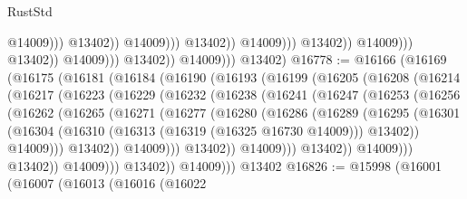 \begin{lexlean}{RustStd}
\begin{coremodule}
                                                              @14009)))
                                                        @13402))
                                                    @14009)))
                                              @13402))
                                          @14009)))
                                    @13402))
                                @14009)))
                          @13402))
                      @14009)))
                @13402))
            @14009)))
      @13402)
@16778 := @16166
    (@16169
      (@16175
        (@16181
          (@16184
            (@16190
              (@16193
                (@16199
                  (@16205
                    (@16208
                      (@16214
                        (@16217
                          (@16223
                            (@16229
                              (@16232
                                (@16238
                                  (@16241
                                    (@16247
                                      (@16253
                                        (@16256
                                          (@16262
                                            (@16265
                                              (@16271
                                                (@16277
                                                  (@16280
                                                    (@16286
                                                      (@16289
                                                        (@16295
                                                          (@16301
                                                            (@16304
                                                              (@16310
                                                                (@16313
                                                                  (@16319 (@16325 @16730 @14009)))
                                                                @13402))
                                                            @14009)))
                                                      @13402))
                                                  @14009)))
                                            @13402))
                                        @14009)))
                                  @13402))
                              @14009)))
                        @13402))
                    @14009)))
              @13402))
          @14009)))
    @13402
@16826 := @15998
    (@16001
      (@16007
        (@16013
          (@16016
            (@16022

\end{coremodule}
\end{lexlean}
